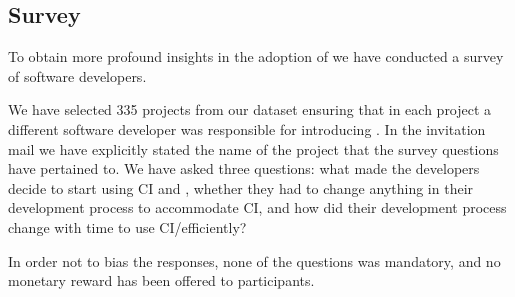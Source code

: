 


\subsection{Survey}
To obtain more profound insights in the adoption of \Tvis we have conducted a survey of software developers.

We have  selected 335 projects from our dataset ensuring that in each project a different software  developer was responsible for introducing \Tvis. 
In the invitation mail we have explicitly stated the name of the project that the survey questions have pertained to.
We have asked three questions: what made the developers decide to start using CI and \Tvis, whether they had to change anything in their development process to accommodate CI, and how did their development process change with time to use CI/\Tvis efficiently?

In order not to bias the responses, none of the questions was mandatory, and no monetary reward has been offered to participants.